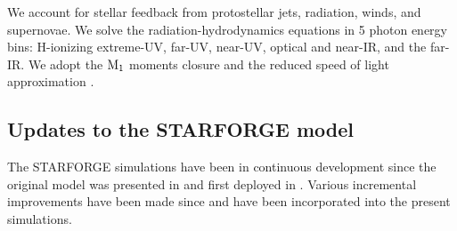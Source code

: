 \documentclass[apjl,twocolumn]{openjournal}
\begin{document}
We account for stellar feedback from protostellar jets, radiation, winds, and supernovae. We solve the radiation-hydrodynamics equations in 5 photon energy bins: H-ionizing extreme-UV, far-UV, near-UV, optical and near-IR, and the far-IR. We adopt the \citet{levermore_1984_M1} $\rm M_1$ moments closure and the reduced speed of light approximation \citep[e.g.][]{rosdahl:2013.ramses.rt,skinner:2013.hyperion}.

\subsection{Updates to the STARFORGE model}
The \small{STARFORGE} simulations have been in continuous development since the original model was presented in \citet{starforge.methods} and first deployed in \citet{starforge.fullphysics}. Various incremental improvements have been made since \citet{starforge.methods} and have been incorporated into the present simulations.
\end{document}

